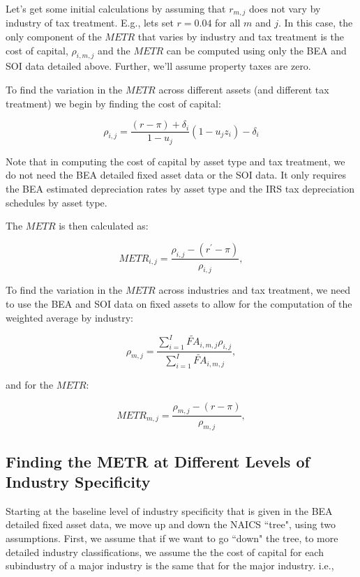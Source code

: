 \documentclass[article,11pt,letterpaper,fleqn]{article}
\theoremstyle{definition}
\numberwithin{equation}{section}
\begin{document}
Let's get some initial calculations by assuming that $r_{m,j}$ does not vary by industry of tax treatment.  E.g., lets set $r=0.04$ for all $m$ and $j$.  In this case, the only component of the $METR$ that varies by industry and tax treatment is the cost of capital, $\rho_{i,m,j}$ and the $METR$ can be computed using only the BEA and SOI data detailed above.  Further, we'll assume property taxes are zero.

To find the variation in the $METR$ across different assets (and different tax treatment) we begin by finding the cost of capital:

\begin{equation}
\rho_{i,j} = \frac{(r-\pi)+\delta_{i}}{1-u_{j}}(1-u_{j}z_{i})-\delta_{i}
\end{equation}

Note that in computing the cost of capital by asset type and tax treatment, we do not need the BEA detailed fixed asset data or the SOI data. It only requires the BEA estimated depreciation rates by asset type and the IRS tax depreciation schedules by asset type.

The $METR$ is then calculated as:

\begin{equation}
METR_{i,j} =  \frac{\rho_{i,j} - (r^{'}-\pi)}{\rho_{i,j}},
\end{equation}

To find the variation in the $METR$ across industries and tax treatment, we need to use the BEA and SOI data on fixed assets to allow for the computation of the weighted average by industry:

\begin{equation}
\rho_{m,j} = \frac{\sum_{i=1}^{I}\widetilde{FA}_{i,m,j}\rho_{i,j}}{\sum_{i=1}^{I}\widetilde{FA}_{i,m,j}} ,
\end{equation}

and for the $METR$:

\begin{equation}
METR_{m,j} =  \frac{\rho_{m,j} - (r-\pi)}{\rho_{m,j}},
\end{equation}

\subsection{Finding the METR at Different Levels of Industry Specificity}

Starting at the baseline level of industry specificity that is given in the BEA detailed fixed asset data, we move up and down the NAICS ``tree", using two assumptions.  First, we assume that if we want to go ``down" the tree, to more detailed industry classifications, we assume the the cost of capital for each subindustry of a major industry is the same that for the major industry.  i.e., 
\end{document}
